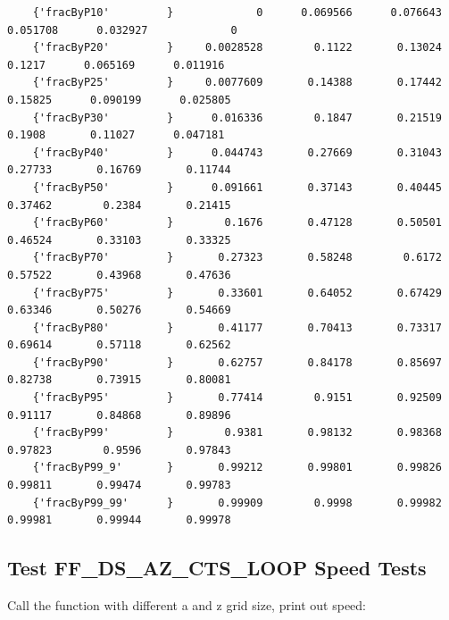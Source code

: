 \documentclass[
]{book}
\begin{document}
\begin{verbatim}
    {'fracByP10'         }             0      0.069566      0.076643      0.051708      0.032927             0 
    {'fracByP20'         }     0.0028528        0.1122       0.13024        0.1217      0.065169      0.011916 
    {'fracByP25'         }     0.0077609       0.14388       0.17442       0.15825      0.090199      0.025805 
    {'fracByP30'         }      0.016336        0.1847       0.21519        0.1908       0.11027      0.047181 
    {'fracByP40'         }      0.044743       0.27669       0.31043       0.27733       0.16769       0.11744 
    {'fracByP50'         }      0.091661       0.37143       0.40445       0.37462        0.2384       0.21415 
    {'fracByP60'         }        0.1676       0.47128       0.50501       0.46524       0.33103       0.33325 
    {'fracByP70'         }       0.27323       0.58248        0.6172       0.57522       0.43968       0.47636 
    {'fracByP75'         }       0.33601       0.64052       0.67429       0.63346       0.50276       0.54669 
    {'fracByP80'         }       0.41177       0.70413       0.73317       0.69614       0.57118       0.62562 
    {'fracByP90'         }       0.62757       0.84178       0.85697       0.82738       0.73915       0.80081 
    {'fracByP95'         }       0.77414        0.9151       0.92509       0.91117       0.84868       0.89896 
    {'fracByP99'         }        0.9381       0.98132       0.98368       0.97823        0.9596       0.97843 
    {'fracByP99_9'       }       0.99212       0.99801       0.99826       0.99811       0.99474       0.99783 
    {'fracByP99_99'      }       0.99909        0.9998       0.99982       0.99981       0.99944       0.99978 
\end{verbatim}

\hypertarget{test-ff_ds_az_cts_loop-speed-tests}{%
\subsection{Test FF\_DS\_AZ\_CTS\_LOOP Speed Tests}\label{test-ff_ds_az_cts_loop-speed-tests}}

Call the function with different a and z grid size, print out speed:
\end{document}
